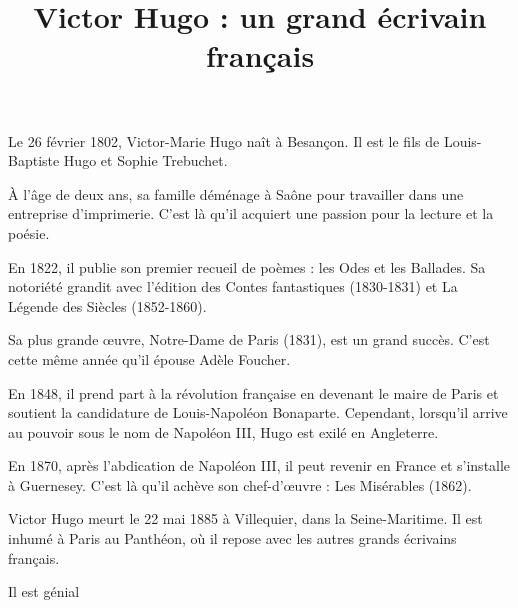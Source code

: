 \documentclass[12pt,a4paper]{article}
\title{Victor Hugo : un grand écrivain français}
\author{}
\date{}
\begin{document}
\maketitle

Le 26 février 1802, Victor-Marie Hugo naît à Besançon. Il est le fils de Louis-Baptiste Hugo et Sophie Trebuchet.

À l'âge de deux ans, sa famille déménage à Saône pour travailler dans une entreprise d'imprimerie. C'est là qu'il acquiert une passion pour la lecture et la poésie.

En 1822, il publie son premier recueil de poèmes : les Odes et les Ballades. Sa notoriété grandit avec l'édition des Contes fantastiques (1830-1831) et La Légende des Siècles (1852-1860).

Sa plus grande œuvre, Notre-Dame de Paris (1831), est un grand succès. C'est cette même année qu'il épouse Adèle Foucher.

En 1848, il prend part à la révolution française en devenant le maire de Paris et soutient la candidature de Louis-Napoléon Bonaparte. Cependant, lorsqu'il arrive au pouvoir sous le nom de Napoléon III, Hugo est exilé en Angleterre.

En 1870, après l'abdication de Napoléon III, il peut revenir en France et s'installe à Guernesey. C'est là qu'il achève son chef-d'œuvre : Les Misérables (1862).

Victor Hugo meurt le 22 mai 1885 à Villequier, dans la Seine-Maritime. Il est inhumé à Paris au Panthéon, où il repose avec les autres grands écrivains français.

Il est génial
\end{document}

